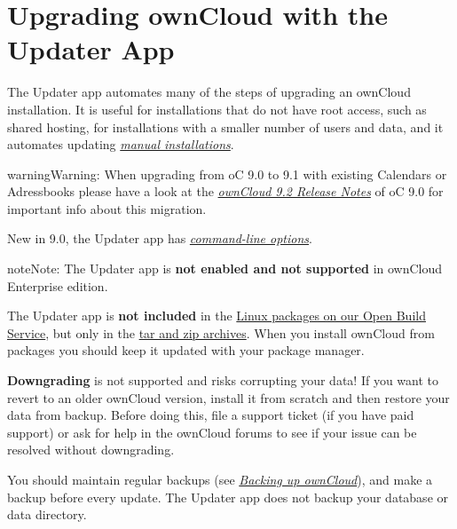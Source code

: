 \documentclass[letterpaper,10pt,english]{sphinxmanual}
\begin{document}
\section{Upgrading ownCloud with the Updater App}
\label{maintenance/update::doc}\label{maintenance/update:upgrading-owncloud-with-the-updater-app}
The Updater app automates many of the steps of upgrading an ownCloud
installation. It is useful for installations that do not have root access,
such as shared hosting, for installations with a smaller number of users
and data, and it automates updating
{\hyperref[installation/source_installation::doc]{\emph{manual installations}}}.

\begin{notice}{warning}{Warning:}
When upgrading from oC 9.0 to 9.1 with existing Calendars or Adressbooks
please have a look at the {\hyperref[release_notes::doc]{\emph{ownCloud 9.2 Release Notes}}} of oC 9.0 for important info
about this migration.
\end{notice}

New in 9.0, the Updater app has {\hyperref[maintenance/update:updater-cli-label]{\emph{command-line options}}}.

\begin{notice}{note}{Note:}
The Updater app is \textbf{not enabled and not supported} in ownCloud
Enterprise edition.

The Updater app is \textbf{not included} in the
\href{https://download.owncloud.org/download/repositories/stable/owncloud/}{Linux packages on our Open Build Service},
but only in the \href{https://owncloud.org/install/\#instructions-server}{tar and zip archives}. When you install
ownCloud from packages you should keep it updated with your package manager.

\textbf{Downgrading} is not supported and risks corrupting your data! If you want
to revert to an older ownCloud version, install it from scratch and then
restore your data from backup. Before doing this, file a support ticket (if
you have paid support) or ask for help in the ownCloud forums to see if your
issue can be resolved without downgrading.
\end{notice}

You should maintain regular backups (see {\hyperref[maintenance/backup::doc]{\emph{Backing up ownCloud}}}), and make a backup
before every update. The Updater app does not backup your database or data
directory.
\end{document}
